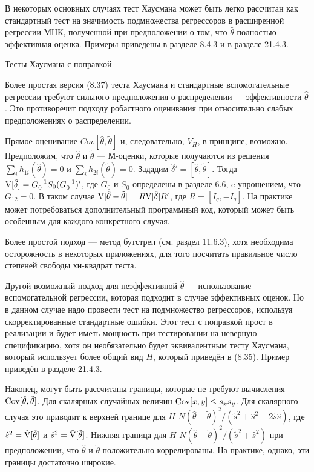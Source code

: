 В некоторых основных случаях тест Хаусмана может быть легко рассчитан как стандартный тест на значимость подмножества регрессоров в расширенной регрессии МНК, полученной при предположении о том, что $\hat{\theta}$ полностью эффективная оценка. Примеры приведены в разделе 8.4.3 и в разделе 21.4.3.

\begin{center}
Тесты Хаусмана с поправкой
\end{center}

Более простая версия (8.37) теста Хаусмана и стандартные вспомогательные регрессии требуют сильного предположения  о распределении --- эффективности $\hat{\theta}$. Это противоречит подходу робастного оценивания  при относительно слабых предположениях о распределении.

Прямое оценивание $Cov[\hat{\theta},\tilde{\theta}]$ и, следовательно, $V_H$, в принципе, возможно. Предположим, что $\hat{\theta}$ и $\tilde{\theta}$ --- М-оценки, которые получаются из решения $\sum_i h_{1i}(\hat{\theta}) = 0$ и $\sum_i h_{2i}(\tilde{\theta}) = 0$. Зададим $\hat{\delta}' = [\hat{\theta},\tilde{\theta}]$. Тогда $\mathrm{V}[\hat{\delta}] = G_0^{-1}S_0( G_0^{-1})'$, где $G_0$ и $S_0$ определены в разделе 6.6, c упрощением, что $G_{12} = 0$. В таком случае $\mathrm{V}[\hat{\theta} - \tilde{\theta}] = R\mathrm{V}[\hat{\delta}]R'$, где $R = [I_q, - I_q]$. На практике может потребоваться дополнительный программный код, который может быть особенным для каждого конкретного случая.

Более простой подход --- метод бутстреп (см. раздел 11.6.3), хотя необходима осторожность в некоторых приложениях, для того посчитать правильное число степеней свободы хи-квадрат теста.

Другой возможный подход для неэффективной $\hat{\theta}$ --- использование вспомогательной регрессии, которая подходит в случае эффективных оценок. Но в данном случае надо провести тест на подмножество регрессоров, используя скорректированные стандартные ошибки. Этот тест с поправкой прост в реализации и будет иметь мощность при тестировании на неверную спецификацию, хотя он необязательно будет эквивалентным тесту Хаусмана, который использует более общий вид $H$, который приведён в (8.35). Пример приведён в разделе 21.4.3.

Наконец, могут быть рассчитаны границы, которые не требуют вычисления $\mathrm{Cov}[\hat{\theta},\tilde{\theta}]$. Для скалярных случайных величин $\mathrm{Cov}[x,y] \leq s_xs_y$. Для скалярного случая это приводит к верхней границе для $H$ $N(\hat{\theta} - \tilde{\theta})^2/(\tilde{s}^2 + \hat{s}^2 - 2\tilde{s}\hat{s})$, где $\hat{s}^2 = \hat{\mathrm{V}}[\hat{\theta}]$ и $\hat{s}^2 = \hat{\mathrm{V}}[\tilde{\theta}]$. Нижняя граница для $H$ $N(\hat{\theta} - \tilde{\theta})^2/(\tilde{s}^2 + \hat{s}^2)$ при предположении, что $\hat{\theta}$ и $\tilde{\theta}$ положительно коррелированы. На практике, однако, эти границы достаточно широкие.

